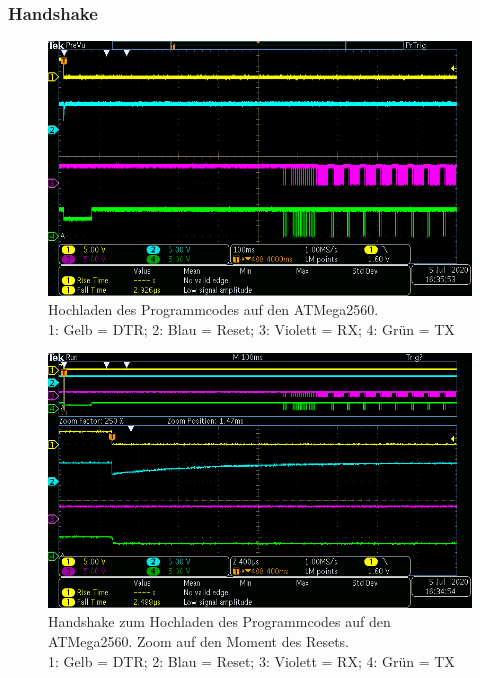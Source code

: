 \subsubsection{Handshake}\label{Appendix:Handshake_uc_Messung}
\begin{figure}[H]
\center
\includegraphics[width = \textwidth]{graphics/ATMega2560_DTR_RESET_RX_TX_gesamt}
\caption{Hochladen des Programmcodes auf den ATMega2560.\\\hspace{\textwidth}1: Gelb = DTR; 2: Blau = Reset; 3: Violett = RX; 4: Grün = TX}
\label{fig:ATMega2560_DTR_RESET_RX_TX_gesamt}
\end{figure}

\begin{figure}[H]
\center
\includegraphics[width =  \textwidth]{graphics/ATMega2560_DTR_RESET_RX_TX_1}
\caption{Handshake zum Hochladen des Programmcodes auf den ATMega2560. Zoom auf den Moment des Resets.\\\hspace{\textwidth}1: Gelb = DTR; 2: Blau = Reset; 3: Violett = RX; 4: Grün = TX}
\label{fig:ATMega2560_DTR_RESET_RX_TX_1}
\end{figure}


